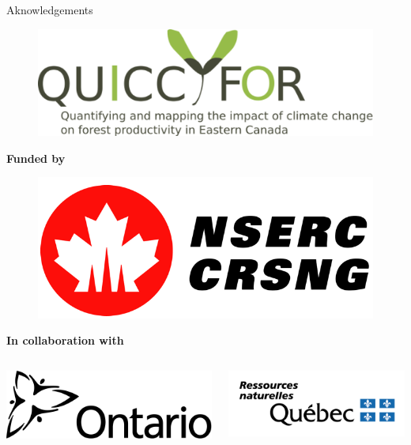 \documentclass[10pt,aspectratio=149]{beamer}
\begin{document}
\begin{frame}[t]{Aknowledgements}
\vspace{-1em}
\begin{center}
		\begin{figure}
			\includegraphics[width=0.3\paperwidth]{logo.png}
		\end{figure}
		\vfill
		\centering \small{\textbf{Funded by}}
		\vfill
		\begin{figure}
			\includegraphics[width=0.2\paperwidth]{nserc.png}
		\end{figure}
		\vfill
		\centering \small{\textbf{In collaboration with}}
		\vfill
\begin{columns}[t]
	\begin{column}{0.19\linewidth}
		\includegraphics[width=0.15\paperwidth]{Figs/logo/logo_11_ORMN.png}			
	\end{column}
	\begin{column}{0.19\linewidth}
		\includegraphics[width=0.15\paperwidth]{Figs/logo/logo_12_MRN.png}	

\end{column}
\end{columns}
\end{center}
\end{frame}
\end{document}
